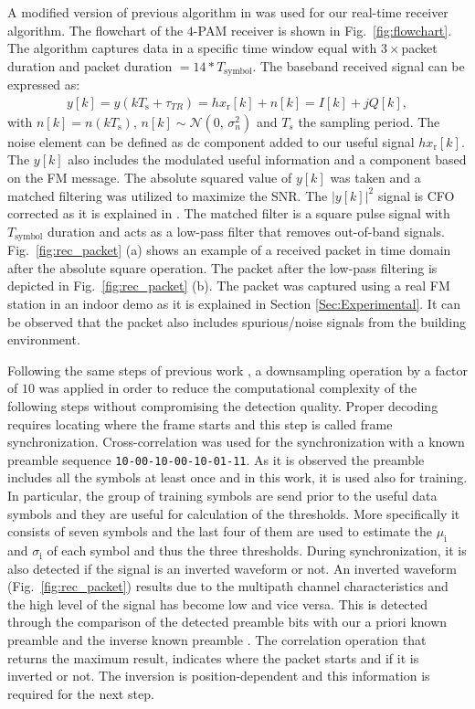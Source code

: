 \documentclass[journal]{IEEEtran}
\begin{document}
A modified version of previous algorithm in \cite{daskalakis2017ambient} was used for our real-time receiver algorithm.
%
The flowchart of the $4$-PAM receiver is shown in Fig.~\ref{fig:flowchart}.
%
The algorithm captures data in a specific time window  equal with  $3\times$packet duration and packet duration $=14*T_\text{symbol}$.  The baseband  received   signal  can be expressed as:
\begin{align}
 y[k] = y(kT_\text{s} +\tau_{TR}) = hx_\text{r}[k] + n[k]= I[k]+jQ[k], 
\end{align}
with $n[k]=n(kT_\text{s})$, $n[k] \sim \mathcal{N}(0,\,\sigma_n^{2})$ and  $T_s$ the  sampling period.
%
The noise  element  can be defined as dc component added to our useful signal $hx_\text{r}[k]$. 
%
The $y[k]$  also includes  the  modulated  useful information and a component based on the FM message. 
% 
The absolute squared value of  $y[k]$ was taken and a matched filtering was utilized to maximize the SNR.
% 
The $\vert y[k]\vert ^2$ signal is CFO corrected as it is explained in \cite{daskalakis2017ambient}. 
%
The  matched filter is a square pulse signal  with  $T_\text{symbol}$ duration and acts as a low-pass filter that removes out-of-band signals. 
%
Fig.~\ref{fig:rec_packet} (a) shows an example of  a received packet  in time domain  after  the absolute square operation. 
%
The  packet after the low-pass filtering is depicted in  Fig.~\ref{fig:rec_packet} (b).
%
 The packet was captured using a real FM station in an indoor demo as it is explained in Section \ref{Sec:Experimental}.
%
It can be observed  that the packet also includes spurious/noise signals from the building environment.
%

Following the same steps of previous work \cite{daskalakis2017ambient},
a downsampling  operation by a factor of  $10$ was applied in order to reduce the computational complexity of the following steps without compromising the detection quality.
%
Proper decoding requires locating where the frame starts and this  step is called frame synchronization.
%
Cross-correlation was used for the synchronization  with  a known preamble sequence \texttt{10-00-10-00-10-01-11}.
%
As it is observed  the preamble includes all the symbols at least once and in this work, it is used also for training. 
%
In particular, the group of training symbols are send prior to the useful data symbols and they are useful for calculation  of the thresholds.
%
More specifically it consists of seven symbols and the last four of them  are used to estimate  the $\mu_\text{i}$ and $\sigma_\text{i}$  of  each symbol and thus the three thresholds.
%
During  synchronization, it is also detected if the signal is an inverted waveform or not. 
%
An inverted waveform (Fig.~\ref{fig:rec_packet}) results due to the multipath channel characteristics
and the high level of the signal has become low and vice versa.
%
This is detected  through the comparison of the detected preamble bits with our a priori known preamble and the inverse known preamble \cite{bamiedakisMSc}.
%
The correlation operation that returns the maximum result, indicates where the packet starts and if it is inverted or not. 
%
The inversion is position-dependent and this information is required for the next step. 
\end{document}
